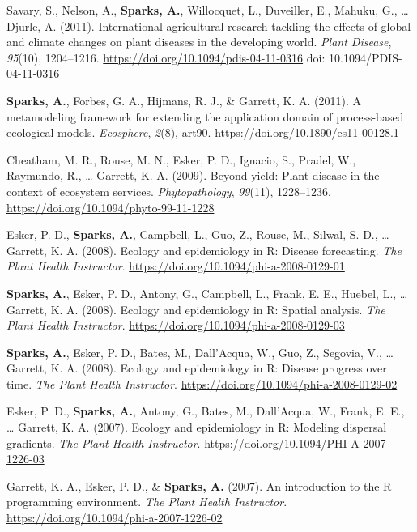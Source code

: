 \documentclass[11pt, a4paper]{awesome-cv}
\newcommand{\CSLBlock}[1]{#1\hfill\break}
\begin{document}
\leavevmode\hypertarget{ref-Savary2011}{}%
Savary, S., Nelson, A., \textbf{Sparks, A.}, Willocquet, L., Duveiller,
E., Mahuku, G., \ldots{} Djurle, A. (2011). International agricultural
research tackling the effects of global and climate changes on plant
diseases in the developing world. \emph{Plant Disease}, \emph{95}(10),
1204--1216. \url{https://doi.org/10.1094/pdis-04-11-0316}
\CSLBlock{doi: 10.1094/PDIS-04-11-0316}

\leavevmode\hypertarget{ref-Sparks2011}{}%
\textbf{Sparks, A.}, Forbes, G. A., Hijmans, R. J., \& Garrett, K. A.
(2011). A metamodeling framework for extending the application domain of
process-based ecological models. \emph{Ecosphere}, \emph{2}(8), art90.
\url{https://doi.org/10.1890/es11-00128.1}

\leavevmode\hypertarget{ref-Cheatham2009}{}%
Cheatham, M. R., Rouse, M. N., Esker, P. D., Ignacio, S., Pradel, W.,
Raymundo, R., \ldots{} Garrett, K. A. (2009). Beyond yield: {Plant}
disease in the context of ecosystem services. \emph{Phytopathology},
\emph{99}(11), 1228--1236.
\url{https://doi.org/10.1094/phyto-99-11-1228}

\leavevmode\hypertarget{ref-Esker2008}{}%
Esker, P. D., \textbf{Sparks, A.}, Campbell, L., Guo, Z., Rouse, M.,
Silwal, S. D., \ldots{} Garrett, K. A. (2008). Ecology and epidemiology
in {R}: Disease forecasting. \emph{The Plant Health Instructor}.
\url{https://doi.org/10.1094/phi-a-2008-0129-01}

\leavevmode\hypertarget{ref-Sparks2008a}{}%
\textbf{Sparks, A.}, Esker, P. D., Antony, G., Campbell, L., Frank, E.
E., Huebel, L., \ldots{} Garrett, K. A. (2008). Ecology and epidemiology
in {R}: Spatial analysis. \emph{The Plant Health Instructor}.
\url{https://doi.org/10.1094/phi-a-2008-0129-03}

\leavevmode\hypertarget{ref-Sparks2008}{}%
\textbf{Sparks, A.}, Esker, P. D., Bates, M., Dall'Acqua, W., Guo, Z.,
Segovia, V., \ldots{} Garrett, K. A. (2008). Ecology and epidemiology in
{R}: Disease progress over time. \emph{The Plant Health Instructor}.
\url{https://doi.org/10.1094/phi-a-2008-0129-02}

\leavevmode\hypertarget{ref-Esker2007}{}%
Esker, P. D., \textbf{Sparks, A.}, Antony, G., Bates, M., Dall'Acqua,
W., Frank, E. E., \ldots{} Garrett, K. A. (2007). Ecology and
epidemiology in {R}: Modeling dispersal gradients. \emph{The Plant
Health Instructor}. \url{https://doi.org/10.1094/PHI-A-2007-1226-03}

\leavevmode\hypertarget{ref-Garrett2007}{}%
Garrett, K. A., Esker, P. D., \& \textbf{Sparks, A.} (2007). An
introduction to the {R} programming environment. \emph{The Plant Health
Instructor}. \url{https://doi.org/10.1094/phi-a-2007-1226-02}
\end{document}
